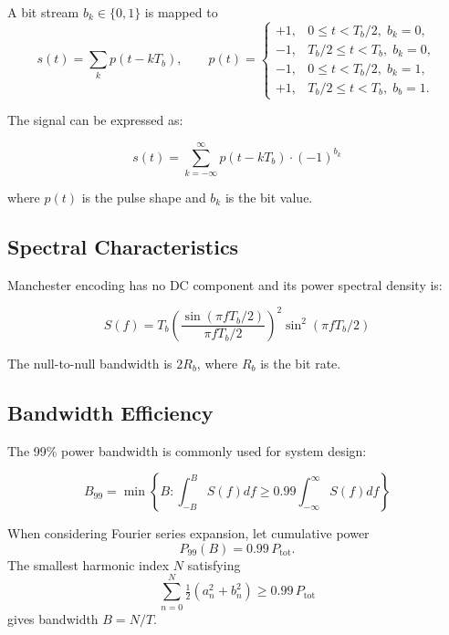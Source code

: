 \documentclass[nohyper,nobib,xcolor=dvipsnames,svgnames,x11names]{tufte-book}
\begin{document}
A bit stream $b_{k}\in\{0,1\}$ is mapped to
\begin{equation}
s(t)=\sum_{k}p(t-kT_{b}),\qquad
p(t)=\begin{cases}
+1,& 0\le t<T_{b}/2,\;b_{k}=0,\\
-1,& T_{b}/2\le t<T_{b},\;b_{k}=0,\\
-1,& 0\le t<T_{b}/2,\;b_{k}=1,\\
+1,& T_{b}/2\le t<T_{b},\;b_{b}=1.
\end{cases}
\end{equation}



The signal can be expressed as:

\begin{equation}
s(t) = \sum_{k=-\infty}^{\infty} p(t - kT_b) \cdot (-1)^{b_k}
\end{equation}

where $p(t)$ is the pulse shape and $b_k$ is the bit value.

\subsection{Spectral Characteristics}

Manchester encoding has no DC component and its power spectral density is:

\begin{equation}
S(f) = T_b \left(\frac{\sin(\pi f T_b/2)}{\pi f T_b/2}\right)^2 \sin^2(\pi f T_b/2)
\end{equation}

The null-to-null bandwidth is $2R_b$, where $R_b$ is the bit rate.

\subsection{Bandwidth Efficiency}

The 99\% power bandwidth is commonly used for system design:

\begin{equation}
B_{99} = \min \left\{ B : \int_{-B}^{B} S(f) df \geq 0.99 \int_{-\infty}^{\infty} S(f) df \right\}
\end{equation}


When considering Fourier series expansion, let cumulative power
\begin{equation}
P_{99}(B)=0.99\,P_{\text{tot}}.
\end{equation}
The smallest harmonic index $N$ satisfying
\begin{equation}
\sum_{n=0}^{N}\tfrac{1}{2}(a_{n}^{2}+b_{n}^{2})\ge 0.99\,P_{\text{tot}}
\end{equation}
gives bandwidth $B=N/T$.
\end{document}
